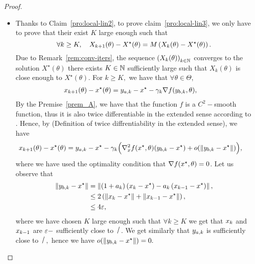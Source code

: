 \begin{appendices}
\begin{proof}
\begin{itemize}
		
\item  Thanks to  Claim~\ref{pro:local-lin2}, to prove claim~\ref{pro:local-lin3}, we only have  to prove that their exist $K$ large enough such that
\[
\forall k\geq K, \quad X_{k+1}(\theta)-X^{\star}(\theta)=M\left({X_{k}(\theta)-X^{\star}(\theta)}\right).
\]
Due to Remark~\ref{rem:conv-iters}, the sequence $\left(X_{k}(\theta)\right)_{k\in\mathbb{N}}$ converges to the solution $X^{\star}(\theta)$  there exists  $K\in\mathbb{N}$ sufficiently large such that $X_{k}(\theta)$ is close enough to $X^{\star}(\theta)$. For $k\geq K,$ we have that  $\forall\theta\in\Theta$, 
\begin{align*}
x_{k+1}(\theta)-x^{\star}(\theta)&=y_{a,k}-x^{\star}-\gamma_{k}\nabla f(y_{b,k},\theta),
\end{align*}
By the Premise~\ref{prem_A}, we have  that the function $f$ is a $C^2-$smooth function, thus it is also twice differentiable in the extended sense according to \cite[Theorem~13.2]{rockafellar_variational_1998}. Hence, by \cite[Definition~13.1]{rockafellar_variational_1998} (Definition of twice diffrentiability in the extended sense), we have
\begin{align*}
x_{k+1}(\theta)-x^{\star}(\theta)&=y_{a,k}-x^{\star}-\gamma_{k}\Big({\nabla_x^2 f(x^{\star},\theta)(y_{b,k}-x^{\star})+o(\left\Vert {y_{b,k}-x^{\star}} \right\Vert)}\Big),
\end{align*}
where we have used the optimality condition that $\nabla f(x^{\star},\theta)=0$. Let us observe that 
\begin{align*}
\left\Vert {y_{b,k}-x^{\star}} \right\Vert&=\left\Vert {(1+a_{k})\left({x_{k}-x^{\star}}\right)-a_{k}\left({x_{k-1}-x^{\star}}\right)} \right\Vert,\\
&\leq 2\left({\left\Vert {x_{k}-x^{\star}} \right\Vert+\left\Vert {x_{k-1}-x^{\star}} \right\Vert}\right),\\
&\leq 4\varepsilon,
\end{align*} 
where we have chosen $K$ large enough such that $\forall k\geq K $ we get that $x_{k}$ and $x_{k-1}$ are $\varepsilon-$ sufficiently close to $\xsol$. We get  similarly that $y_{a,k}$ is sufficiently close to $\xsol,$ hence we have $o(\left\Vert {y_{b,k}-x^{\star}} \right\Vert)=0.$ 


\end{itemize}
\end{proof}
\end{appendices}
